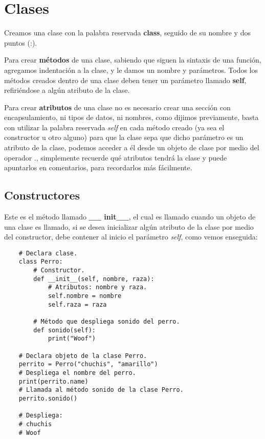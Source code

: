\section{Clases}

Creamos una clase con la palabra reservada \textbf{class}, seguido de su nombre y dos puntos (:).

Para crear \textbf{métodos} de una clase, sabiendo que siguen la sintaxis de una función,  agregamos indentación a la clase, y le damos un nombre y parámetros. Todos los métodos creados dentro de una clase deben tener un parámetro llamado \textbf{self}, refiriéndose a algún atributo de la clase.

Para crear \textbf{atributos} de una clase no es necesario crear una sección con encapsulamiento, ni tipos de datos, ni nombres, como dijimos previamente, basta con utilizar la palabra reservada \textit{self} en cada método creado (ya sea el constructor u otro alguno) para que la clase sepa que dicho parámetro es un atributo de la clase, podemos acceder a él desde un objeto de clase por medio del operador ., simplemente recuerde qué atributos tendrá la clase y puede apuntarlos en comentarios, para recordarlos más fácilmente.


\subsection{Constructores}

Este es el método llamado \textbf{\_\_ init\_\_}, el cual es llamado cuando un objeto de una clase es llamado, si se desea inicializar algún atributo de la clase por medio del constructor, debe contener al inicio el parámetro \textit{self}, como vemos enseguida:
\begin{lstlisting}
    # Declara clase.
    class Perro:
        # Constructor.
        def __init__(self, nombre, raza):
            # Atributos: nombre y raza.
            self.nombre = nombre
            self.raza = raza

        # Método que despliega sonido del perro.
        def sonido(self):
            print("Woof")

    # Declara objeto de la clase Perro.
    perrito = Perro("chuchis", "amarillo")
    # Despliega el nombre del perro.
    print(perrito.name)
    # Llamada al método sonido de la clase Perro.
    perrito.sonido()
      
    # Despliega:
    # chuchis
    # Woof
\end{lstlisting}


